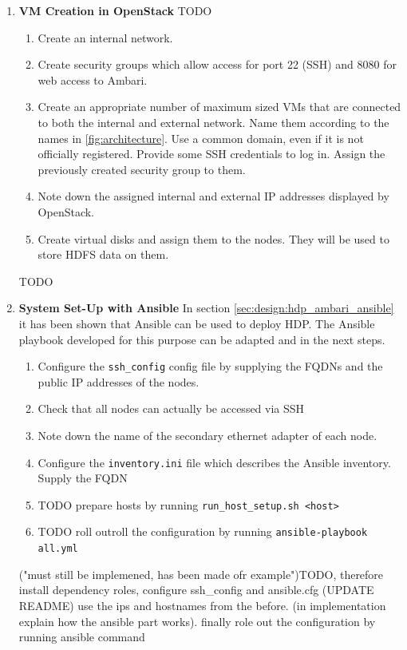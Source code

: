 \begin{enumerate}
    \item \textbf{\ac{VM} Creation in OpenStack}
    TODO
    \begin{enumerate}
        \item Create an internal network.
        \item Create security groups which allow access for port 22 (\ac{SSH}) and 8080 for web access to Ambari.
        \item Create an appropriate number of maximum sized \acp{VM} that are connected to both the internal and external network. Name them according to the names in \ref{fig:architecture}. Use a common domain, even if it is not officially registered. Provide some SSH credentials to log in.
        Assign the previously created security group to them.
        \item Note down the assigned internal and external \ac{IP} addresses displayed by OpenStack.
        \item Create virtual disks and assign them to the nodes. They will be used to store \ac{HDFS} data on them.
    \end{enumerate}
    TODO 

    
    \item \textbf{System Set-Up with Ansible} 
    In section \vref{sec:design:hdp_ambari_ansible} it has been shown that Ansible can be used to deploy \ac{HDP}. The Ansible playbook developed for this purpose can be adapted and in the next steps.
    \begin{enumerate}
        \item Configure the \texttt{ssh\_config} config file by supplying the \acp{FQDN} and the public \ac{IP} addresses of the nodes. 
        \item Check that all nodes can actually be accessed via \ac{SSH}
        \item Note down the name of the secondary ethernet adapter of each node.
        \item Configure the \texttt{inventory.ini} file which describes the Ansible inventory. Supply the \ac{FQDN}
        \item TODO prepare hosts by running \texttt{run\_host\_setup.sh <host>}
        \item TODO roll outroll the configuration by running \texttt{ansible-playbook all.yml}
    \end{enumerate}
    
    ("must still be implemened, has been made ofr example")TODO,
    therefore install dependency roles, configure ssh\_config and ansible.cfg (UPDATE README) use the ips and hostnames from the before. (in implementation explain how the ansible part works). finally role out the configuration by running ansible command
    

\end{enumerate}
